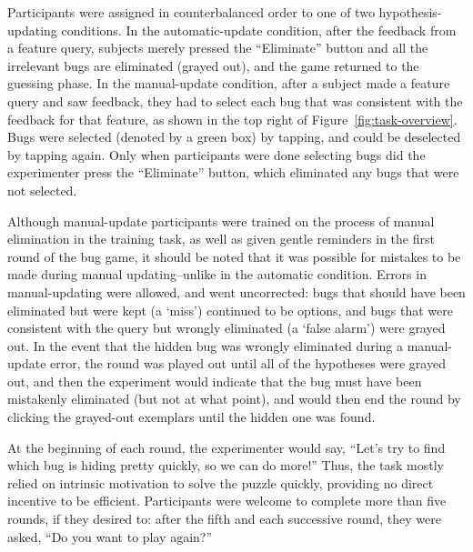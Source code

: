 \documentclass[man,floatsintext]{apa6}
\begin{document}
Participants were assigned in counterbalanced order to one of two hypothesis-updating conditions. In the automatic-update condition, after the feedback from a 
feature query, subjects merely pressed the ``Eliminate'' button and all the irrelevant bugs 
are eliminated (grayed out), and the game returned to the guessing phase. In the 
manual-update condition, after a subject made a feature query and saw feedback, 
they had to select each bug that was consistent with the feedback for that feature, as 
shown in the top right of Figure~\ref{fig:task-overview}. Bugs were selected (denoted by a green box) by 
tapping, and could be deselected by tapping again. Only when participants were done 
selecting bugs did the experimenter press the ``Eliminate'' button, which eliminated 
any bugs that were not selected. 

Although manual-update participants were trained on the process of manual elimination in the 
training task, as well as given gentle reminders in the first round of the bug game, it should be 
noted that it was possible for mistakes to be made during manual updating--unlike in the automatic 
condition. Errors in manual-updating were allowed, and went uncorrected: bugs that should have been eliminated but were kept (a `miss') continued to be options, and bugs that were consistent with the query but wrongly eliminated (a `false alarm') were grayed out. In the event that the hidden bug was wrongly eliminated during a manual-update error, the round was played out until all of the hypotheses were grayed out, and then the experiment would indicate that the bug must have been mistakenly eliminated (but not at what point), and would then end the round by clicking the grayed-out exemplars until the hidden one was found.

At the beginning of each round, the experimenter would say, ``Let's try to find which bug is hiding pretty quickly, so we can do more!'' Thus, the task mostly relied on intrinsic motivation to solve the puzzle quickly, providing no direct incentive to be efficient. Participants were welcome to complete more than five rounds, if they desired to: after the fifth and each successive round, they were asked, ``Do you want to play again?''
\end{document}
